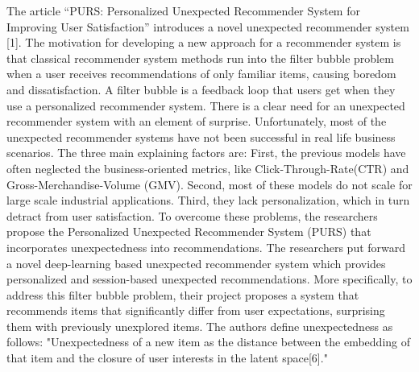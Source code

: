 The article “PURS: Personalized Unexpected Recommender System for Improving User Satisfaction” introduces a novel unexpected recommender system [1]. The motivation for developing a new approach for a recommender system is that classical recommender system methods run into the filter bubble problem when a user receives recommendations of only familiar items, causing boredom and dissatisfaction. A filter bubble is a feedback loop that users get when they use a personalized recommender system. There is a clear need for an unexpected recommender system with an element of surprise.
Unfortunately, most of the unexpected recommender systems have not been successful in real life business scenarios. The three main explaining factors are: First, the previous models have often neglected the business-oriented metrics, like  Click-Through-Rate(CTR) and Gross-Merchandise-Volume (GMV). Second, most of these models do not scale for large scale industrial applications. Third, they lack personalization, which in turn detract from user satisfaction. To overcome these problems, the researchers propose the Personalized Unexpected Recommender System (PURS) that incorporates unexpectedness into recommendations. The researchers put forward a novel deep-learning based unexpected recommender system which provides personalized and session-based unexpected recommendations. More specifically, to address this filter bubble problem, their project proposes a system that recommends items that significantly differ from user expectations, surprising them with previously unexplored items. The authors define unexpectedness as follows: "Unexpectedness of a new item as the distance between the embedding of that item and the closure of user interests in the latent space[6]." 
	
